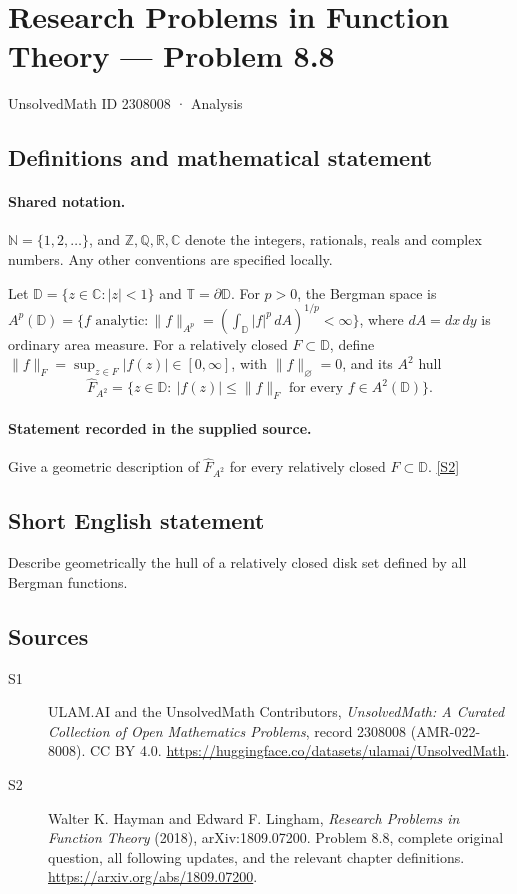 \documentclass[11pt]{book}
\newcommand{\sref}[2]{\hyperlink{source:#1:#2}{[S#2]}}
\begin{document}
\setcounter{section}{2308007}
\section{Research Problems in Function Theory — Problem 8.8}\label{2308008}
{\small\sffamily UnsolvedMath ID 2308008 · Analysis}
\subsection{Definitions and mathematical statement}

\paragraph{Shared notation.}$\mathbb N=\{1,2,\ldots\}$, and $\mathbb Z,\mathbb Q,\mathbb R,\mathbb C$ denote the integers, rationals, reals and complex numbers. Any other conventions are specified locally.


Let $\mathbb D=\{z\in\mathbb C:|z|<1\}$ and $\mathbb T=\partial\mathbb D$. For $p>0$, the Bergman space is $A^p(\mathbb D)=\{f\text{ analytic}:\|f\|_{A^p}=(\int_{\mathbb D}|f|^p\,dA)^{1/p}<\infty\}$, where $dA=dx\,dy$ is ordinary area measure. For a relatively closed $F\subset\mathbb D$, define $\|f\|_F=\sup_{z\in F}|f(z)|\in[0,\infty]$, with $\|f\|_\varnothing=0$, and its $A^2$ hull \[\widehat F_{A^2}=\{z\in\mathbb D:\ |f(z)|\le\|f\|_F\text{ for every }f\in A^2(\mathbb D)\}.\]
\paragraph{Statement recorded in the supplied source.}
Give a geometric description of $\widehat F_{A^2}$ for every relatively closed $F\subset\mathbb D$. \sref{2308008}{2}
\subsection{Short English statement}
Describe geometrically the hull of a relatively closed disk set defined by all Bergman functions.
\subsection{Sources}
\begin{description}
\item[\hypertarget{source:2308008:1}{S1}] ULAM.AI and the UnsolvedMath Contributors, \emph{UnsolvedMath: A Curated Collection of Open Mathematics Problems}, record 2308008 (AMR-022-8008). CC BY 4.0. \url{https://huggingface.co/datasets/ulamai/UnsolvedMath}.
\item[\hypertarget{source:2308008:2}{S2}] Walter K. Hayman and Edward F. Lingham, \emph{Research Problems in Function Theory} (2018), arXiv:1809.07200. Problem 8.8, complete original question, all following updates, and the relevant chapter definitions. \url{https://arxiv.org/abs/1809.07200}.
\end{description}
\label{end:2308008}
\end{document}
